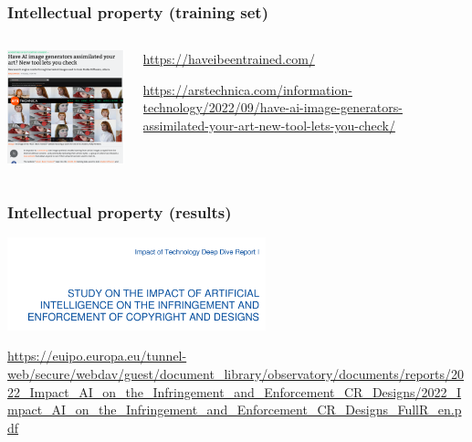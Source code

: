 \documentclass[17pt,aspectratio=169,hyperref={pdfusetitle,colorlinks,allcolors=olive}]{beamer}
\begin{document}
\begin{frame}[fragile]
  \frametitle{Intellectual property (training set)}

  \begin{columns}[T]
    \begin{column}{.58\textwidth}
        \includegraphics[width=7.5cm]{figs/used-art}
    \end{column}%
    \hfill%
    \begin{column}{.38\textwidth}

        \vspace{0.5cm}
        
        {\scriptsize
          \url{https://haveibeentrained.com/} \\

          \vspace{1cm}
      
          \url{https://arstechnica.com/information-technology/2022/09/have-ai-image-generators-assimilated-your-art-new-tool-lets-you-check/} \\
        }
    \end{column}%
  \end{columns}
  
\end{frame}


\begin{frame}[fragile]
  \frametitle{Intellectual property (results)}

        \includegraphics[width=7.5cm]{figs/impact-ai-copyright}
  
        {\scriptsize
          \url{https://euipo.europa.eu/tunnel-web/secure/webdav/guest/document_library/observatory/documents/reports/2022_Impact_AI_on_the_Infringement_and_Enforcement_CR_Designs/2022_Impact_AI_on_the_Infringement_and_Enforcement_CR_Designs_FullR_en.pdf} \\
        }
        
\end{frame}
\end{document}
